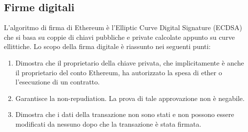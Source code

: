 \subsection*{Firme digitali}
L'algoritmo di firma di Ethereum è l'Elliptic Curve Digital Signature (ECDSA) che si basa su coppie di chiavi pubbliche e private calcolate appunto su curve ellittiche. Lo scopo della firma digitale è riassunto nei seguenti punti:
\begin{enumerate}
	\item Dimostra che il proprietario della chiave privata, che implicitamente è anche il proprietario del conto Ethereum, ha autorizzato la spesa di ether o l'esecuzione di un contratto.
	\item Garantisce la non-repudiation. La prova di tale approvazione non è negabile.
	\item Dimostra che i dati della transazione non sono stati e non possono essere modificati da nessuno dopo che la transazione è stata firmata.
\end{enumerate}

